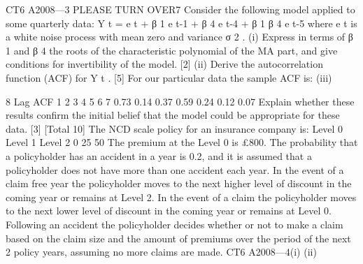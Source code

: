 CT6 A2008—3
PLEASE TURN OVER7
Consider the following model applied to some quarterly data:
Y t = e t + β 1 e t-1 + β 4 e t-4 + β 1 β 4 e t-5
where e t is a white noise process with mean zero and variance σ 2 .
(i) Express in terms of β 1 and β 4 the roots of the characteristic polynomial of the
MA part, and give conditions for invertibility of the model.
[2]
(ii) Derive the autocorrelation function (ACF) for Y t .
[5]
For our particular data the sample ACF is:
(iii)


8
Lag ACF
1
2
3
4
5
6
7 0.73
0.14
0.37
0.59
0.24
0.12
0.07
Explain whether these results confirm the initial belief that the model could be
appropriate for these data.
[3]
[Total 10]
The NCD scale policy for an insurance company is:
Level 0
Level 1
Level 2
0%
25%
50%
The premium at the Level 0 is £800. The probability that a policyholder has an
accident in a year is 0.2, and it is assumed that a policyholder does not have more than
one accident each year.
In the event of a claim free year the policyholder moves to the next higher level of
discount in the coming year or remains at Level 2.
In the event of a claim the policyholder moves to the next lower level of discount in
the coming year or remains at Level 0.
Following an accident the policyholder decides whether or not to make a claim based
on the claim size and the amount of premiums over the period of the next 2 policy
years, assuming no more claims are made.
CT6 A2008—4(i)
(ii)

